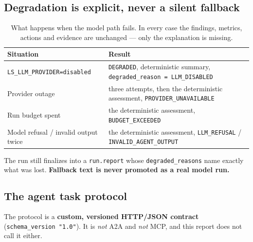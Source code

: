 \documentclass[11pt,a4paper]{article}
\begin{document}
\subsection{Degradation is explicit, never a silent fallback}

\begin{table}[h]
\centering\small
\caption{What happens when the model path fails. In every case the findings,
metrics, actions and evidence are unchanged --- only the explanation is missing.}
\begin{tabular}{@{}ll@{}}
\toprule
\textbf{Situation} & \textbf{Result}\\
\midrule
\texttt{LS\_LLM\_PROVIDER=disabled} & \texttt{DEGRADED}, deterministic summary, \texttt{degraded\_reason = LLM\_DISABLED}\\
Provider outage & three attempts, then the deterministic assessment, \texttt{PROVIDER\_UNAVAILABLE}\\
Run budget spent & the deterministic assessment, \texttt{BUDGET\_EXCEEDED}\\
Model refusal / invalid output twice & the deterministic assessment, \texttt{LLM\_REFUSAL} / \texttt{INVALID\_AGENT\_OUTPUT}\\
\bottomrule
\end{tabular}
\end{table}

The run still finalizes into a \texttt{run.report} whose
\texttt{degraded\_reasons} name exactly what was lost. \textbf{Fallback text is
never promoted as a real model run.}

\subsection{The agent task protocol}

The protocol is a \textbf{custom, versioned HTTP/JSON contract}
(\texttt{schema\_version "1.0"}). It is \emph{not} A2A and \emph{not} MCP, and
this report does not call it either.
\end{document}
